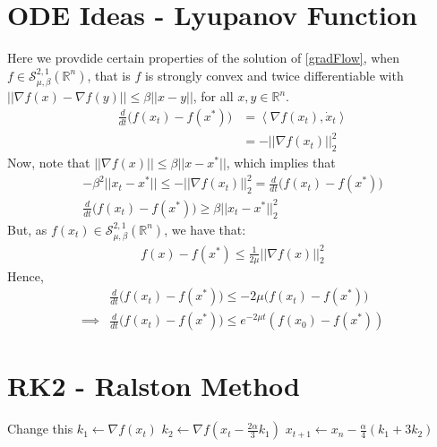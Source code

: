 \documentclass[12pt,twoside]{article}
\begin{document}
\section{ODE Ideas - Lyupanov Function}
Here we provdide certain properties of the solution of \eqref{gradFlow}, when $f \in \mathcal{S}^{2,1}_{\mu,\beta}(\mathbb{R}^n)$, that is $f$ is strongly convex and twice differentiable with $|| \nabla f(x) - \nabla f(y) || \leq \beta ||x - y||$, for all $x,y \in \mathbb{R}^n$.
\begin{equation}
\begin{aligned}
\frac{d}{dt}\big(f(x_t) - f(x^*) \big) &= \left\langle \nabla f(x_t), \dot{x}_t \right\rangle \\
& = - ||\nabla f(x_t)||_2^2
\end{aligned}
\end{equation}
Now, note that $|| \nabla f(x) || \leq \beta || x - x^* ||$, which implies that
\begin{equation}
\begin{aligned}
- \beta^2 || x_t - x^* || \leq -||\nabla f(x_t)||_2^2 = \frac{d}{dt}\big(f(x_t) -f(x^*)\big) \\
\frac{d}{dt} \big(f(x_t) - f(x^*) \big) \geq \beta || x_t - x^* ||_2^2
\end{aligned}
\end{equation}
But, as $f(x_t)\in \mathcal{S}^{2,1}_{\mu,\beta}(\mathbb{R}^n)$, we have that:
\begin{equation}
\begin{aligned}
f(x) - f(x^*) \leq \frac{1}{2\mu}|| \nabla f(x)||_2^2
\end{aligned}
\end{equation}
Hence,
\begin{equation}
\begin{aligned}
& \frac{d}{dt} \big(f(x_t) - f(x^*) \big) \leq -2\mu \big(f(x_t) - f(x^*)\big) \\
\implies & \frac{d}{dt} \big(f(x_t) - f(x^*) \big) \leq e^{-2\mu t}(f(x_0) - f(x^*))
\end{aligned}
\end{equation}
\section{RK2 - Ralston Method}

\begin{algorithmic}
\STATE Change this
	\STATE $k_1 \gets \nabla f(x_t)$
	\STATE $k_2 \gets \nabla f(x_t - \frac{2\alpha}{3} k_1) $
	\STATE $x_{t+1} \gets x_n - \frac{\alpha}{4}(k_1 + 3 k_2)$
\ENDFOR
\end{algorithmic}
\end{document}
